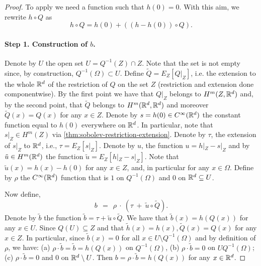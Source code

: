 \begin{proof}

To apply \citet{bourdaud2011composition} we need a function such that $h(0) = 0$. With this aim, we rewrite $h \circ Q$ as
$$h \circ Q = h(0) + ((h-h(0)) \circ Q).$$
\paragraph{Step 1. Construction of $b$.}

Denote by $U$ the open set $U = Q^{-1}(Z) \cap Z$. Note that the set is not empty since, by construction, $Q^{-1}(\Omega) \subset U$.
Define $\tilde{Q} = E_{Z}[Q|_{Z}]$, i.e. the extension to the whole $\mathbb R^d$ of the restriction of $Q$ on the set $Z$ (restriction and extension done componentwise). By the first point we have that $Q|_{Z}$ belongs to $H^m(Z,\mathbb R^d)$ and, by the second point, that $\tilde{Q}$ belongs to $H^m(\mathbb R^d, \mathbb R^d)$ and moreover $\tilde{Q}(x) = Q(x)$ for any $x \in Z$.
Denote by $s = h(0) \in C^\infty(\mathbb R^d)$ the constant function equal to $h(0)$ everywhere on $\mathbb R^d$. In particular, note that $s|_Z \in H^m(Z)$ via \cref{thm:sobolev-restriction-extension}. Denote by $\tau$, the extension of $s|_Z$ to $\mathbb R^d$, i.e., $\tau = E_Z[s|_Z]$. Denote by $u$, the function $u = h|_Z - s|_Z$ and by $\tilde{u} \in H^m(\mathbb R^d)$ the function $\tilde{u} = E_{Z}[h|_Z - s|_Z]$. Note that $\tilde{u}(x) = h(x) - h(0)$ for any
$x \in Z$, and, in particular for any $x \in \Omega$. Define by $\rho$ the $C^\infty(\mathbb R^d)$ function that is $1$ on $Q^{-1}(\Omega)$ and $0$ on $\mathbb R^d \subseteq U$.

Now define,
$$b ~~=~~ \rho ~\cdot~ (\tau ~+~ \tilde{u} \circ \tilde{Q}).$$
Denote by $\tilde{b}$ the function $\tilde{b} = \tau + \tilde{u} \circ \tilde{Q}$. We have that $\tilde{b}(x) = h(Q(x))$ for any $x \in U$. Since $Q(U) \subseteq Z$ and that $\tilde{h}(x) = h(x), \tilde{Q}(x) = Q(x)$ for any $x \in Z$. In particular, since $\tilde{b}(x) = 0$ for all $x \in U \setminus Q^{-1}(\Omega)$ and by definition of $\rho$, we have: (a)  $\rho \cdot \tilde{b} = \tilde{b} = h(Q(x))$ on $Q^{-1}(\Omega)$, (b) $\rho \cdot \tilde{b} = 0$ on $U Q^{-1}(\Omega)$; (c) $\rho \cdot \tilde{b} = 0$ and $0$ on $\mathbb R^d \setminus U$. Then $b = \rho \cdot \tilde{b} = h(Q(x))$ for any $x \in \mathbb R^d$.




\end{proof}
